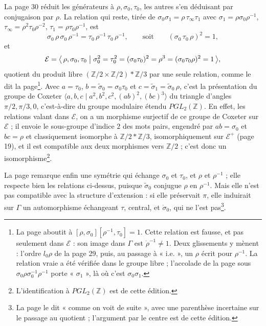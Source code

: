\documentclass[11pt,a4paper]{article}
\begin{document}
La page 30 réduit les générateurs à $\rho, \sigma_0, \tau_0$, les autres s'en
déduisant par conjugaison par $\rho$. La relation qui reste, tirée de
$\sigma_0\sigma_1 = \rho\,\tau_\infty\tau_1$ avec $\sigma_1 = \rho\sigma_0
\rho^{-1}$, $\tau_\infty = \rho^2\tau_0\rho^{-2}$, $\tau_1 = \rho\tau_0\rho^{-1}$,
est
\[
\sigma_0\,\rho\,\sigma_0\,\rho^{-1} = \tau_0\,\rho^{-1}\,\tau_0\,\rho^{-1},
\qquad \text{soit} \qquad (\sigma_0\,\tau_0\,\rho)^2 = 1 ,
\]
et
\[
\mathcal{E} = \bigl\langle\, \rho, \sigma_0, \tau_0 \bigm| \sigma_0^2 =
\tau_0^2 = (\sigma_0\tau_0)^2 = \rho^3 = (\sigma_0\tau_0\rho)^2 = 1
\,\bigr\rangle ,
\]
quotient du produit libre $(\mathbb{Z}/2 \times \mathbb{Z}/2) * \mathbb{Z}/3$
par une seule relation, comme le dit la page\footnote{La page aboutit à
$[\rho, \sigma_0][\rho^{-1}, \tau_0] = 1$. Cette relation est fausse, et pas
seulement dans $\mathcal{E}$ : son image dans $\Gamma$ est $\dot\rho^{-1} \neq 1$.
Deux glissements y mènent : l'ordre $l_0\rho$ de la page 29, puis, au passage à
« i.e. », un $\rho$ écrit pour $\rho^{-1}$. La relation vraie a été vérifiée
dans le groupe libre ; l'accolade de la page sous $\sigma_0\rho\sigma_0^{-1}
\rho^{-1}$ porte « $\sigma_1$ », là où c'est $\sigma_0\sigma_1$.}. Avec
$a = \tau_0$, $b = \tilde\sigma_0 = \sigma_0\tau_0$ et $c = \tilde\sigma_1 =
\tilde\sigma_0\,\rho$, c'est la présentation du groupe de Coxeter
$\langle a, b, c \mid a^2, b^2, c^2, (ab)^2, (bc)^3 \rangle$ du triangle
d'angles $\pi/2, \pi/3, 0$, c'est-à-dire du groupe modulaire étendu
$PGL_2(\mathbb{Z})$. En effet, les relations valant dans $\mathcal{E}$, on
a un morphisme surjectif de ce groupe de Coxeter sur $\mathcal{E}$ ; il envoie
le sous-groupe d'indice $2$ des mots pairs, engendré par $ab = \sigma_0$ et
$bc = \rho$ et classiquement isomorphe à $\mathbb{Z}/2 * \mathbb{Z}/3$,
isomorphiquement sur $\mathcal{E}^{+}$ (page 19), et il est compatible aux
deux morphismes vers $\mathbb{Z}/2$ ; c'est donc un isomorphisme\footnote{L'identification à $PGL_2(\mathbb{Z})$ est de cette édition.}.

La page remarque enfin une symétrie qui échange $\sigma_0$ et $\tau_0$, et
$\rho$ et $\rho^{-1}$ ; elle respecte bien les relations ci-dessus, puisque
$\tilde\sigma_0$ conjugue $\rho$ en $\rho^{-1}$. Mais elle n'est pas compatible
avec la structure d'extension : si elle préservait $\pi$, elle induirait sur
$\Gamma$ un automorphisme échangeant $\tau$, central, et $\dot\sigma_0$, qui ne
l'est pas\footnote{La page le dit « comme on voit de suite », avec une
parenthèse incertaine sur le passage au quotient ; l'argument par le centre est
de cette édition.}.
\end{document}
